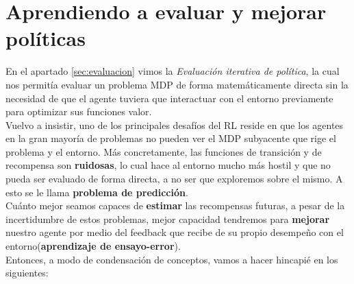 \documentclass[11pt,fleqn]{book} %
\begin{document}

\section{Aprendiendo a evaluar y mejorar políticas}

En el apartado \ref{sec:evaluacion} vimos la \textit{Evaluación iterativa de política}, la cual nos permitía evaluar un problema MDP de forma matemáticamente directa sin la necesidad de que el agente tuviera que interactuar con el entorno previamente para optimizar sus funciones valor. \\

Vuelvo a insistir, uno de los principales desafíos del RL reside en que los agentes en la gran mayoría de problemas no pueden ver el MDP subyacente que rige el problema y el entorno. Más concretamente, las funciones de transición y de recompensa son \textbf{ruidosas}, lo cual hace al entorno mucho más hostil y que no pueda ser evaluado de forma directa, a no ser que exploremos sobre el mismo. A esto se le llama \textbf{problema de predicción}. \\

Cuánto mejor seamos capaces de \textbf{estimar} las recompensas futuras, a pesar de la incertidumbre de estos problemas, mejor capacidad tendremos para \textbf{mejorar} nuestro agente por medio del feedback que recibe de su propio desempeño con el entorno(\textbf{aprendizaje de ensayo-error}). \\

Entonces, a modo de condensación de conceptos, vamos a hacer hincapié en los siguientes: \\
\end{document}
